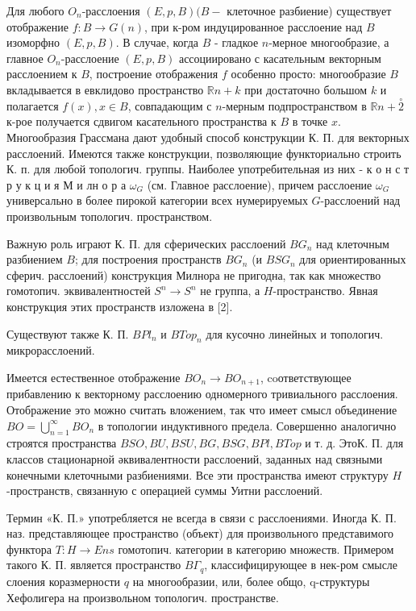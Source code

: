 \documentclass[10pt]{article}
\begin{document}
Для любого $O_{n}$-расслоения $(E, p, B)(B-$ клеточное разбиение) существует отображение $f: B \rightarrow G(n)$, при к-ром индуцированное расслоение над $B$ изоморфно $(E, p, B)$. В случае, когда $B$ - гладкое $n$-мерное многообразие, а главное $O_{n}$-расслоение $(E, p, B)$ ассоциировано с касательным векторным расслоением к $B$, построение отображения $f$ особенно просто: многообразие $B$ вкладывается в евклидово пространство $\mathbb{R} n+k$ при достаточно большом $k$ и полагается $f(x), x \in B$, совпадающим с $n$-мерным подпространством в $\mathbb{R} n+\stackrel{\circ}{2}$ к-рое получается сдвигом касательного пространства к $B$ в точке $x$. Многообразия Грассмана дают удобный способ конструкции К. П. для векторных расслоений. Имеются также конструкции, позволяющие функториально строить К. п. для любой топологич. группы. Наиболее употребительная из них - к о н с т р у к ц и я М и лн о р а $\omega_{G}$ (см. Главное расслоение), причем расслоение $\omega_{G}$ универсально в более пирокой категории всех нумерируемых $G$-расслоений над произвольным топологич. пространством.



Важную роль играют К. П. для сферических расслоений $B G_{n}$ над клеточным разбиением $B$; для построения пространств $B G_{n}$ (и $B S G_{n}$ для ориентированных сферич. расслоений) конструкция Милнора не пригодна, так как множество гомотопич. эквивалентностей $S^{n} \rightarrow S^{n}$ не группа, а $H$-пространство. Явная конструкция этих пространств изложена в [2].



Существуют также К. П. $B P l_{n}$ и $B T o p_{n}$ для кусочно линейных и топологич. микрорасслоений.



Имеется естественное отображение $B O_{n} \rightarrow B O_{n+1}$, coответствующее прибавлению к векторному расслоению одномерного тривиального расслоения. Отображение это можно считать вложением, так что имеет смысл объединение $B O=\bigcup_{n=1}^{\infty} B O_{n}$ в топологии индуктивного предела. Совершенно аналогично строятся пространства $B S O, B U, B S U, B G, B S G, B P l, B T o p$ и т. д. ЭтоК. П. для классов стационарной әквивалентности расслоений, заданных над связными конечными клеточными разбиениями. Все эти пространства имеют структуру $H$-пространств, связанную с операцией суммы Уитни расслоений.



Термин «К. П.» употребляется не всегда в связи с расслоениями. Иногда К. П. наз. представляющее пространство (объект) для произвольного представимого функтора $T: H \rightarrow E n s$ гомотопич. категории в категорию множеств. Примером такого К. П. является пространство $B \Gamma_{q}$, классифицирующее в нек-ром смысле слоения коразмерности $q$ на многообразии, или, более общо, q-структуры Хефолигера на произвольном топологич. пространстве.
\end{document}
